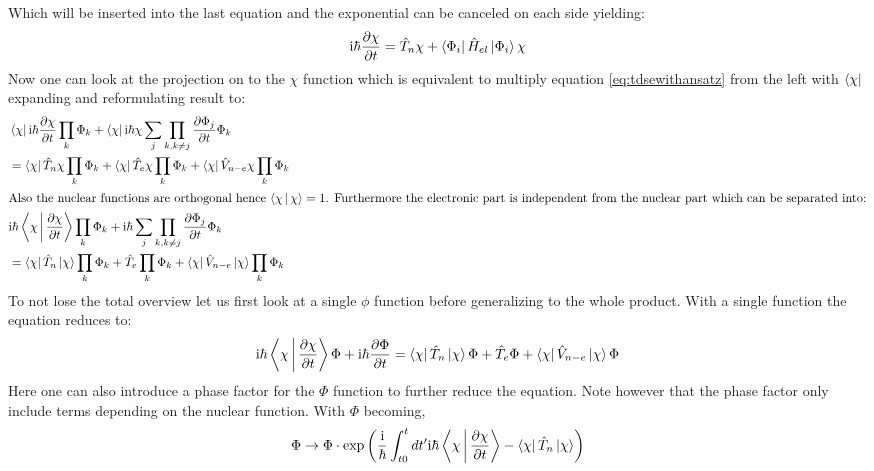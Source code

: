 \documentclass[12pt]{scrartcl}
\begin{document}
Which will be inserted into the last equation and the exponential can be canceled on each side yielding:
\begin{equation}
\mathrm{i}\hbar \frac{\partial \chi}{\partial t} = \hat{T}_n\chi+  \Bra{\Phi_i} \hat{H}_{el}\Ket{\Phi_i} \chi
\label{eqfornuclearpart}
\end{equation}
Now one can look at the projection on to the $\chi$ function which is equivalent to multiply equation \ref{eq:tdsewithansatz} from the left with $\Bra{\chi}$ expanding and reformulating result to:
\begin{align*}
&\Bra{\chi}\mathrm{i}\hbar \frac{\partial \chi}{\partial t} \prod_{k} \Phi_k + \Bra{\chi} \mathrm{i}\hbar \chi \sum_{j}\prod_{k,k \neq j} \frac{\partial\Phi_j}{\partial t}\Phi_k \\ &= \Bra{\chi} \hat{T}_n \chi \prod_{k} \Phi_k + \Bra{\chi} \hat{T}_e \chi \prod_{k} \Phi_k + \Bra{\chi} \hat{V}_{n-e} \chi \prod_{k} \Phi_k\\
\intertext{Also the nuclear functions are orthogonal hence $\Braket{\chi | \chi}=1$. Furthermore the electronic part is independent from the nuclear part which can be separated into:}
&\mathrm{i}\hbar \Braket{\chi|\frac{\partial \chi}{\partial t}} \prod_{k} \Phi_k + \mathrm{i}\hbar \sum_{j}\prod_{k,k \neq j} \frac{\partial\Phi_j}{\partial t}\Phi_k \\&= \Bra{\chi}\hat{T}_n\Ket{\chi} \prod_{k} \Phi_k + \hat{T}_e \prod_{k} \Phi_k + \Bra{\chi} \hat{V}_{n-e} \Ket{\chi} \prod_{k} \Phi_k
\end{align*}
To not lose the total overview let us first look at a single $\phi$ function before generalizing to the whole product. With a single function the equation reduces to:
\begin{align*}
\mathrm{i}\hbar \Braket{\chi|\frac{\partial \chi}{\partial t}} \Phi + \mathrm{i}\hbar \frac{\partial\Phi}{\partial t} = \Bra{\chi}\hat{T}_n\Ket{\chi} \Phi + \hat{T}_e \Phi + \Bra{\chi} \hat{V}_{n-e} \Ket{\chi} \Phi
\end{align*}
Here one can also introduce a phase factor for the $\Phi$ function to further reduce the equation. Note however that the phase factor only include terms depending on the nuclear function. With $\Phi$ becoming,
\begin{equation}
\Phi \rightarrow \Phi \cdot \exp\left(\frac{\mathrm{i}}{\hbar} \int_{t0}^{t}dt' \mathrm{i}\hbar \Braket{\chi|\frac{\partial \chi}{\partial t}} - \Bra{\chi}\hat{T}_n\Ket{\chi}   \right)
\label{phasefactorsinglephi}
\end{equation}
\end{document}
